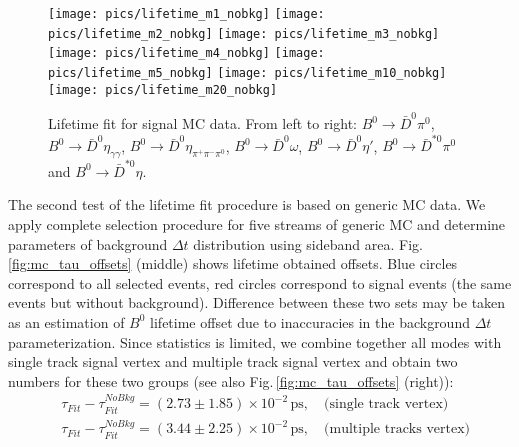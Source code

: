 \documentclass[preprint,aps,showpacs]{revtex4}
\newcommand{\dt}{\ensuremath{\Delta t}\xspace}
\newcommand{\bdpi}{\ensuremath{B^0\to \bar D^0\pi^0}\xspace}
\newcommand{\bdetagg}{\ensuremath{B^0\to \bar D^0\eta_{\gamma\gamma}}\xspace}
\newcommand{\bdetap}{\ensuremath{B^0\to \bar D^0\eta\prime}\xspace}
\newcommand{\bdetappp}{\ensuremath{B^0\to \bar D^0\eta_{\pi^+\pi^-\pi^0}}\xspace}
\newcommand{\bdomega}{\ensuremath{B^0\to \bar D^0\omega}\xspace}
\newcommand{\btodstpi}{\ensuremath{B^0\to \bar D^{*0}\pi^0}\xspace}
\newcommand{\btodsteta}{\ensuremath{B^0\to \bar D^{*0}\eta}\xspace}
\newcommand{\mbc}{\ensuremath{M_{bc}}\xspace}
\begin{document}
\begin{figure}
 \texttt{[image: pics/lifetime\_m1\_nobkg]}
 \texttt{[image: pics/lifetime\_m2\_nobkg]}
 \texttt{[image: pics/lifetime\_m3\_nobkg]}
 \texttt{[image: pics/lifetime\_m4\_nobkg]}
 \texttt{[image: pics/lifetime\_m5\_nobkg]}
 \texttt{[image: pics/lifetime\_m10\_nobkg]}
 \texttt{[image: pics/lifetime\_m20\_nobkg]}
 \caption{Lifetime fit for signal MC data. From left to right: \bdpi, \bdetagg, \bdetappp, \bdomega, \bdetap, \btodstpi and \btodsteta.}%
 \label{fig:sig_mc_lifetime}
\end{figure}


The second test of the lifetime fit procedure is based on generic MC data. We apply complete selection procedure for five streams of generic MC and determine parameters of background \dt distribution using sideband area. Fig.\,\ref{fig:mc_tau_offsets} (middle) shows lifetime obtained offsets. Blue circles correspond to all selected events, red circles correspond to signal events (the same events but without background). Difference between these two sets may be taken as an estimation of $B^0$ lifetime offset due to inaccuracies in the background \dt parameterization. Since statistics is limited, we combine together all modes with single track signal vertex and multiple track signal vertex and obtain two numbers for these two groups (see also Fig.\,\ref{fig:mc_tau_offsets} (right)):
\begin{equation}
\begin{split}
 &\tau_{Fit} - \tau_{Fit}^{NoBkg} = (2.73 \pm 1.85)\times10^{-2}\,\text{ps},\quad\text{(single track vertex)}\\
 &\tau_{Fit} - \tau_{Fit}^{NoBkg} = (3.44 \pm 2.25)\times10^{-2}\,\text{ps},\quad\text{(multiple tracks vertex)}\\
\end{split}
\end{equation}
\end{document}
